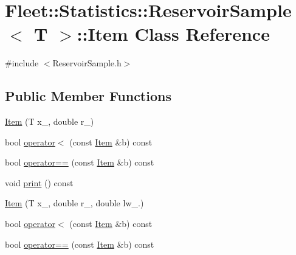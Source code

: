 \hypertarget{class_fleet_1_1_statistics_1_1_reservoir_sample_1_1_item}{}\section{Fleet\+:\+:Statistics\+:\+:Reservoir\+Sample$<$ T $>$\+:\+:Item Class Reference}
\label{class_fleet_1_1_statistics_1_1_reservoir_sample_1_1_item}


{\ttfamily \#include $<$Reservoir\+Sample.\+h$>$}

\subsection*{Public Member Functions}
\begin{DoxyCompactItemize}
\item 
\hyperlink{class_fleet_1_1_statistics_1_1_reservoir_sample_1_1_item_a355a3b655f4aa8e9cd151cb46054ee0e}{Item} (T x\+\_\+, double r\+\_\+)
\item 
bool \hyperlink{class_fleet_1_1_statistics_1_1_reservoir_sample_1_1_item_a06bf92e43a3bfe61e75a8bf0d6fa2c67}{operator$<$} (const \hyperlink{class_fleet_1_1_statistics_1_1_reservoir_sample_1_1_item}{Item} \&b) const
\item 
bool \hyperlink{class_fleet_1_1_statistics_1_1_reservoir_sample_1_1_item_ab3adc1f593aec74d7d140f8c3553546e}{operator==} (const \hyperlink{class_fleet_1_1_statistics_1_1_reservoir_sample_1_1_item}{Item} \&b) const
\item 
void \hyperlink{class_fleet_1_1_statistics_1_1_reservoir_sample_1_1_item_a9cbecacee3b118d645d3f9a42782382b}{print} () const
\item 
\hyperlink{class_fleet_1_1_statistics_1_1_reservoir_sample_1_1_item_acad6abfadffe65005f14a4c9616aabde}{Item} (T x\+\_\+, double r\+\_\+, double lw\+\_.)
\item 
bool \hyperlink{class_fleet_1_1_statistics_1_1_reservoir_sample_1_1_item_a06bf92e43a3bfe61e75a8bf0d6fa2c67}{operator$<$} (const \hyperlink{class_fleet_1_1_statistics_1_1_reservoir_sample_1_1_item}{Item} \&b) const
\item 
bool \hyperlink{class_fleet_1_1_statistics_1_1_reservoir_sample_1_1_item_ab3adc1f593aec74d7d140f8c3553546e}{operator==} (const \hyperlink{class_fleet_1_1_statistics_1_1_reservoir_sample_1_1_item}{Item} \&b) const
\end{DoxyCompactItemize}
